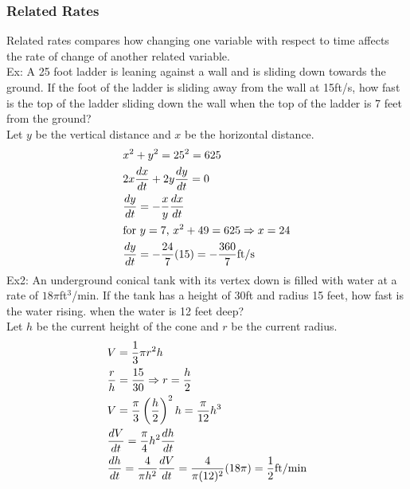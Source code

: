 \documentclass[11pt, fleqn]{article}
\begin{document}
\subsubsection{Related Rates}
Related rates compares how changing one variable with respect to time affects the rate of change of another related variable.\\
Ex: A 25 foot ladder is leaning against a wall and is sliding down towards the ground. If the foot of the ladder is sliding away from the wall at 15ft/s, how fast is the top of the ladder sliding down the wall when the top of the ladder is 7 feet from the ground?\\
Let $y$ be the vertical distance and $x$ be the horizontal distance.\\
\begin{align*}
    &x^2+y^2=25^2=625\\
    &2x\frac{dx}{dt}+2y\frac{dy}{dt}=0\\
    &\frac{dy}{dt}=-\frac{x}{y}\frac{dx}{dt}\\
    &\text{for $y=7$, }x^2+49=625\Rightarrow x=24\\
    &\frac{dy}{dt}=-\frac{24}{7}(15)=-\frac{360}{7}\mathrm{ft/s}
\end{align*}
Ex2: An underground conical tank with its vertex down is filled with water at a rate of $18\pi$ft$^3$/min. If the tank has a height of 30ft and radius 15 feet, how fast is the water rising. when the water is 12 feet deep?\\
Let $h$ be the current height of the cone and $r$ be the current radius.
\begin{align*}
    &V=\frac{1}{3}\pi r^2h\\
    &\frac{r}{h}=\frac{15}{30}\Rightarrow r=\frac{h}{2}\\
    &V=\frac{\pi}{3}\left( \frac{h}{2} \right)^2h=\frac{\pi}{12}h^3\\
    &\frac{dV}{dt}=\frac{\pi}{4}h^2\frac{dh}{dt}\\
    &\frac{dh}{dt}=\frac{4}{\pi h^2}\frac{dV}{dt}=\frac{4}{\pi(12)^2}(18\pi)=\frac{1}{2}\mathrm{ft/min}
\end{align*}
\end{document}
